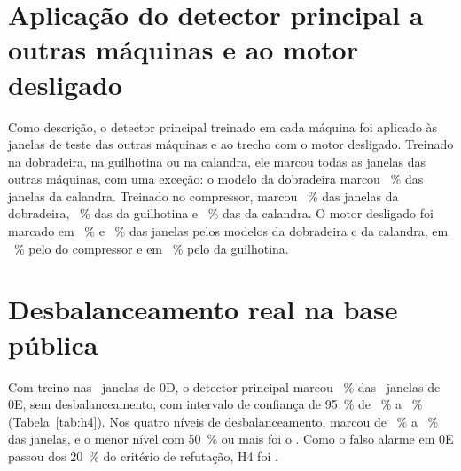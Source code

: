 \section{Aplicação do detector principal a outras máquinas e ao motor desligado}\label{sec:res-condicao}

Como descrição, o detector principal treinado em cada máquina foi aplicado às janelas de teste das outras máquinas e ao trecho com o motor desligado. Treinado na dobradeira, na guilhotina ou na calandra, ele marcou todas as janelas das outras máquinas, com uma exceção: o modelo da dobradeira marcou \condDobradeiraCalandra~\% das janelas da calandra. Treinado no compressor, marcou \condCompressorDobradeira~\% das janelas da dobradeira, \condCompressorGuilhotina~\% das da guilhotina e \condCompressorCalandra~\% das da calandra. O motor desligado foi marcado em \condDobradeiraParado~\% e \condCalandraParado~\% das janelas pelos modelos da dobradeira e da calandra, em \condCompressorParado~\% pelo do compressor e em \condGuilhotinaParado~\% pelo da guilhotina.

\section{Desbalanceamento real na base pública}\label{sec:res-h4}

Com treino nas \hQuatroNTreino\ janelas de 0D, o detector principal marcou \hQuatroFracaoZero~\% das \hQuatroNZero\ janelas de 0E, sem desbalanceamento, com intervalo de confiança de \SI{95}{\percent} de \hQuatroIcInfZero~\% a \hQuatroIcSupZero~\% (Tabela~\ref{tab:h4}). Nos quatro níveis de desbalanceamento, marcou de \hQuatroFracaoTres~\% a \hQuatroFracaoQuatro~\% das janelas, e o menor nível com \SI{50}{\percent} ou mais foi o \hQuatroMenorNivel. Como o falso alarme em 0E passou dos \SI{20}{\percent} do critério de refutação, H4 foi \hQuatroVeredito.

